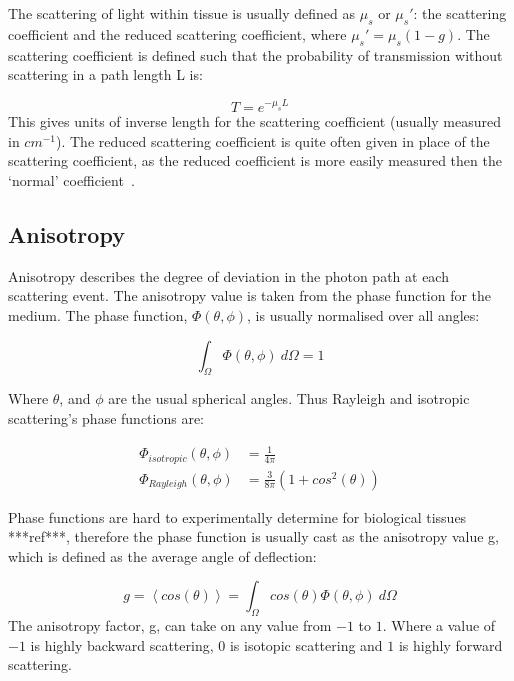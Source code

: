 \medskip

The scattering of light within tissue is usually defined as $\mu_s$ or $\mu_s'$: the scattering coefficient and the reduced scattering coefficient, where $\mu_s'=\mu_s(1-g)$. The scattering coefficient is defined such that the probability of transmission without scattering in a path length L is:

\begin{equation}
	T=e^{-\mu_sL}
\end{equation}
This gives units of inverse length for the scattering coefficient (usually measured in $cm^{-1}$). The reduced scattering coefficient is quite often given in place of the scattering coefficient, as the reduced coefficient is more easily measured then the `normal' coefficient~\cite{jacques2013optical}.

\subsection{Anisotropy}\label{sec:ansio}

Anisotropy describes the degree of deviation in the photon path at each scattering event. The anisotropy value is taken from the phase function for the medium. The phase function, $\Phi(\theta,\phi)$, is usually normalised over all angles:

\begin{equation}
	\int_{\Omega}\Phi(\theta,\phi)\ d\Omega = 1
\end{equation}

Where $\theta$, and $\phi$ are the usual spherical angles.
Thus Rayleigh and isotropic scattering's phase functions are:

\begin{align}
	\Phi_{isotropic}(\theta,\phi)&=\frac{1}{4\pi}\\
	\Phi_{Rayleigh}(\theta,\phi)&=\frac{3}{8\pi}(1+cos^2(\theta))
\end{align}

Phase functions are hard to experimentally determine for biological tissues ***ref***, therefore the phase function is usually cast as the anisotropy value g, which is defined as the average angle of deflection:

\begin{equation}
	g=\left<cos(\theta)\right>=\int_{\Omega}cos(\theta)\Phi(\theta,\phi)\ d\Omega
\end{equation}
The anisotropy factor, g, can take on any value from $-1$ to $1$. Where a value of $-1$ is highly backward scattering, $0$ is isotopic scattering and $1$ is highly forward scattering.

